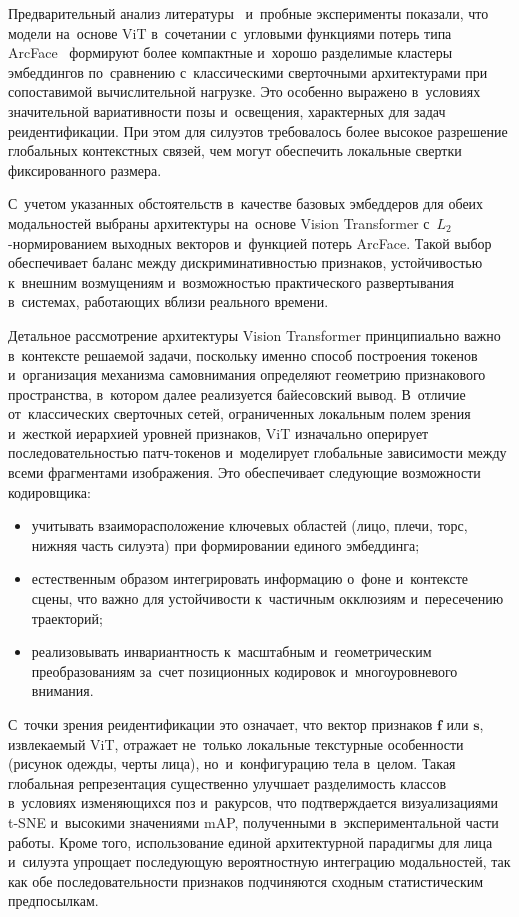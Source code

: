 Предварительный анализ литературы~\cite{Deng2019arcface,Dosovitskiy2020vit,Hermans2017triplet}
и~пробные эксперименты показали, что модели на~основе ViT
в~сочетании с~угловыми функциями потерь типа
ArcFace~\cite{Deng2019arcface} формируют более компактные и~хорошо
разделимые кластеры эмбеддингов по~сравнению с~классическими
сверточными архитектурами при сопоставимой вычислительной нагрузке.
Это особенно выражено в~условиях значительной вариативности позы
и~освещения, характерных для задач реидентификации. При этом для
силуэтов требовалось более высокое разрешение глобальных контекстных
связей, чем могут обеспечить локальные свертки фиксированного размера.

С~учетом указанных обстоятельств в~качестве базовых эмбеддеров для
обеих модальностей выбраны архитектуры на~основе Vision Transformer
с~$L_2$-нормированием выходных векторов и~функцией потерь ArcFace.
Такой выбор обеспечивает баланс между дискриминативностью признаков,
устойчивостью к~внешним возмущениям и~возможностью практического
развертывания в~системах, работающих вблизи реального времени.

Детальное рассмотрение архитектуры Vision Transformer принципиально
важно в~контексте решаемой задачи, поскольку именно способ построения
токенов и~организация механизма самовнимания определяют геометрию
признакового пространства, в~котором далее реализуется байесовский
вывод. В~отличие от~классических сверточных сетей, ограниченных
локальным полем зрения и~жесткой иерархией уровней признаков, ViT
изначально оперирует последовательностью патч-токенов и~моделирует
глобальные зависимости между всеми фрагментами изображения. Это
обеспечивает следующие возможности кодировщика:
\begin{itemize}
    \item учитывать взаиморасположение ключевых областей (лицо, плечи,
          торс, нижняя часть силуэта) при формировании единого
          эмбеддинга;
    \item естественным образом интегрировать информацию о~фоне
          и~контексте сцены, что важно для устойчивости к~частичным
          окклюзиям и~пересечению траекторий;
    \item реализовывать инвариантность к~масштабным и~геометрическим
          преобразованиям за~счет позиционных кодировок
          и~многоуровневого внимания.
\end{itemize}

С~точки зрения реидентификации это означает, что вектор признаков
$\mathbf{f}$ или $\mathbf{s}$, извлекаемый ViT, отражает не~только
локальные текстурные особенности (рисунок одежды, черты лица),
но~и~конфигурацию тела в~целом. Такая глобальная репрезентация
существенно улучшает разделимость классов в~условиях изменяющихся поз
и~ракурсов, что подтверждается визуализациями t-SNE и~высокими
значениями mAP, полученными в~экспериментальной части работы. Кроме
того, использование единой архитектурной парадигмы для лица и~силуэта
упрощает последующую вероятностную интеграцию модальностей, так как
обе последовательности признаков подчиняются сходным статистическим
предпосылкам.

